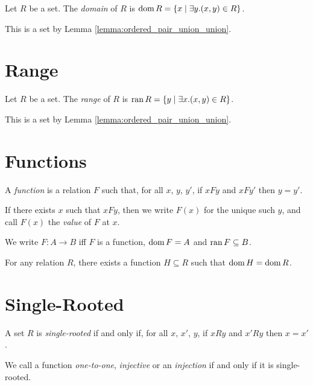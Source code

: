 \begin{definition}
    Let $R$ be a set. The \emph{domain} of $R$ is $\operatorname{dom} R = \{ x \mid \exists y. (x,y) \in R \}$.

    This is a set by Lemma \ref{lemma:ordered_pair_union_union}.
\end{definition}

\section{Range}

\begin{definition}
    Let $R$ be a set. The \emph{range} of $R$ is $\operatorname{ran} R = \{ y \mid \exists x. (x,y) \in R \}$.

    This is a set by Lemma \ref{lemma:ordered_pair_union_union}.
\end{definition}

\section{Functions}

\begin{definition}
A \emph{function} is a relation $F$ such that, for all $x$, $y$, $y'$, if $xFy$ and $xFy'$ then $y = y'$.

If there exists $x$ such that $xFy$, then we write $F(x)$ for the unique such $y$, and call $F(x)$
the \emph{value} of $F$ at $x$.
\end{definition}

\begin{definition}
    We write $F : A \rightarrow B$ iff $F$ is a function, $\operatorname{dom} F = A$
    and $\operatorname{ran} F \subseteq B$.
\end{definition}

\begin{axiom}
    For any relation $R$, there exists a function $H \subseteq R$ such that 
    $\operatorname{dom} H = \operatorname{dom} R$.
\end{axiom}

\section{Single-Rooted}

\begin{definition}
    A set $R$ is \emph{single-rooted} if and only if, for all $x$, $x'$, $y$, if $xRy$ and $x'Ry$ then $x = x'$.

    We call a function \emph{one-to-one}, \emph{injective} or an \emph{injection}
     if and only if it is single-rooted.
\end{definition}

